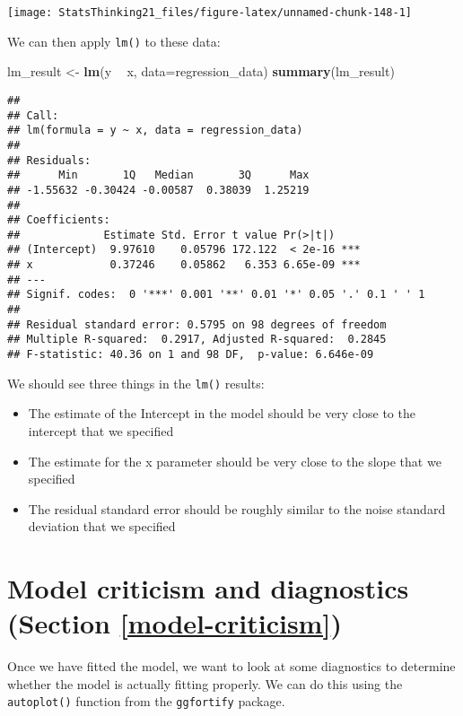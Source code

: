 \documentclass[12pt,]{book}
\newenvironment{Shaded}{\begin{snugshade}}{\end{snugshade}}
\newcommand{\DataTypeTok}[1]{\textcolor[rgb]{0.13,0.29,0.53}{#1}}
\newcommand{\KeywordTok}[1]{\textcolor[rgb]{0.13,0.29,0.53}{\textbf{#1}}}
\newcommand{\NormalTok}[1]{#1}
\newcommand{\OperatorTok}[1]{\textcolor[rgb]{0.81,0.36,0.00}{\textbf{#1}}}
\newcommand{\StringTok}[1]{\textcolor[rgb]{0.31,0.60,0.02}{#1}}
\providecommand{\tightlist}{%
  \setlength{\itemsep}{0pt}\setlength{\parskip}{0pt}}
\begin{document}
\texttt{[image: StatsThinking21\_files/figure-latex/unnamed-chunk-148-1]}

We can then apply \texttt{lm()} to these data:

\begin{Shaded}
\begin{Highlighting}[]
\NormalTok{lm_result <-}\StringTok{ }\KeywordTok{lm}\NormalTok{(y }\OperatorTok{~}\StringTok{ }\NormalTok{x, }\DataTypeTok{data=}\NormalTok{regression_data)}
\KeywordTok{summary}\NormalTok{(lm_result)}
\end{Highlighting}
\end{Shaded}

\begin{verbatim}
## 
## Call:
## lm(formula = y ~ x, data = regression_data)
## 
## Residuals:
##      Min       1Q   Median       3Q      Max 
## -1.55632 -0.30424 -0.00587  0.38039  1.25219 
## 
## Coefficients:
##             Estimate Std. Error t value Pr(>|t|)    
## (Intercept)  9.97610    0.05796 172.122  < 2e-16 ***
## x            0.37246    0.05862   6.353 6.65e-09 ***
## ---
## Signif. codes:  0 '***' 0.001 '**' 0.01 '*' 0.05 '.' 0.1 ' ' 1
## 
## Residual standard error: 0.5795 on 98 degrees of freedom
## Multiple R-squared:  0.2917, Adjusted R-squared:  0.2845 
## F-statistic: 40.36 on 1 and 98 DF,  p-value: 6.646e-09
\end{verbatim}

We should see three things in the \texttt{lm()} results:

\begin{itemize}
\tightlist
\item
  The estimate of the Intercept in the model should be very close to the intercept that we specified
\item
  The estimate for the x parameter should be very close to the slope that we specified
\item
  The residual standard error should be roughly similar to the noise standard deviation that we specified
\end{itemize}

\hypertarget{model-criticism-and-diagnostics-section-refmodel-criticism}{%
\section{Model criticism and diagnostics (Section \ref{model-criticism})}\label{model-criticism-and-diagnostics-section-refmodel-criticism}}

Once we have fitted the model, we want to look at some diagnostics to determine whether the model is actually fitting properly. We can do this using the \texttt{autoplot()} function from the \texttt{ggfortify} package.
\end{document}
